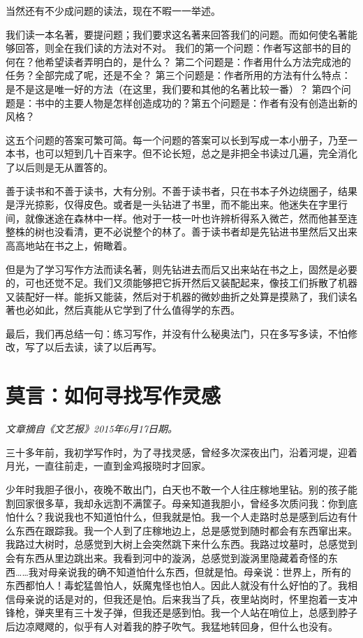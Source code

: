 \documentclass[12pt,a5paper]{ctexbook}
\begin{document}
当然还有不少成问题的读法，现在不暇一一举述。

我们读一本名著，要提问题；我们要求这名著来回答我们的问题。而如何使名著能够回答，则全在我们读的方法对不对。
我们的第一个问题：作者写这部书的目的何在？他希望读者弄明白的，是什么？
第二个问题是：作者用什么方法完成池的任务？全部完成了呢，还是不全？
第三个问题是：作者所用的方法有什么特点：是不是这是唯一好的方法（在这里，我们要和其他的名著比较一番）？
第四个问题是：书中的主要人物是怎样创造成功的？第五个问题是：作者有没有创造出新的风格？

这五个问题的答案可繁可简。每一个问题的答案可以长到写成一本小册子，乃至一本书，也可以短到几十百来字。但不论长短，总之是非把全书读过几遍，完全消化了以后则是无从置答的。

善于读书和不善于读书，大有分别。不善于读书者，只在书本子外边绕圈子，结果是浮光掠影，仅得皮色。或者是一头钻进了书里，而不能出来。他迷失在字里行间，就像迷途在森林中一样。他对于一枝一叶也许辨析得系入微芒，然而他甚至连整株的树也没看清，更不必说整个的林了。善于读书者却是先钻进书里然后又出来高高地站在书之上，俯瞰着。

但是为了学习写作方法而读名著，则先钻进去而后又出来站在书之上，固然是必要的，可也还觉不足。我们又须能够把它拆开然后又装配起来，像技工们拆散了机器又装配好一样。能拆又能装，然后对于机器的微妙曲折之处算是摸熟了，我们读名著也必如此，然后真能从它学到了什么值得学的东西。

最后，我们再总结一句：练习写作，并没有什么秘奥法门，只在多写多读，不怕修改，写了以后去读，读了以后再写。

\newpage

\section{莫言：如何寻找写作灵感}

\emph{文章摘自《文艺报》2015年6月17日期。}
\vspace{2em}

三十多年前，我初学写作时，为了寻找灵感，曾经多次深夜出门，沿着河堤，迎着月光，一直往前走，一直到金鸡报晓时才回家。

少年时我胆子很小，夜晚不敢出门，白天也不敢一个人往庄稼地里钻。别的孩子能割回家很多草，我却永远割不满筐子。母亲知道我胆小，曾经多次质问我：你到底怕什么？我说我也不知道怕什么，但我就是怕。我一个人走路时总是感到后边有什么东西在跟踪我。我一个人到了庄稼地边上，总是感觉到随时都会有东西窜出来。我路过大树时，总感觉到大树上会突然跳下来什么东西。我路过坟墓时，总感觉到会有东西从里边跳出来。我看到河中的漩涡，总感觉到漩涡里隐藏着奇怪的东西……我对母亲说我的确不知道怕什么东西，但就是怕。母亲说：世界上，所有的东西都怕人！毒蛇猛兽怕人，妖魔鬼怪也怕人。因此人就没有什么好怕的了。我相信母亲说的话是对的，但我还是怕。后来我当了兵，夜里站岗时，怀里抱着一支冲锋枪，弹夹里有三十发子弹，但我还是感到怕。我一个人站在哨位上，总感到脖子后边凉飕飕的，似乎有人对着我的脖子吹气。我猛地转回身，但什么也没有。
\end{document}
